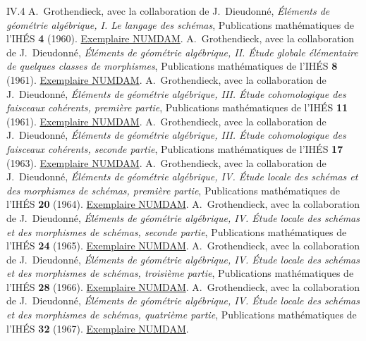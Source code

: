 \documentclass[11pt,a4paper]{article}
\begin{document}
\begin{thebibliography}{IV.4}
 A.~Grothendieck, avec la collaboration de J.~Dieudonné,
\emph{Éléments de géométrie algébrique, I. Le langage des schémas},
Publications mathématiques de l'IHÉS \textbf{4} (1960).
\href{https://numdam.org/item/PMIHES_1960__4__5_0/}{Exemplaire NUMDAM}.
 A.~Grothendieck, avec la collaboration de J.~Dieudonné,
\emph{Éléments de géométrie algébrique, II. Étude globale élémentaire
de quelques classes de morphismes}, Publications mathématiques de
l'IHÉS \textbf{8} (1961).
\href{https://www.numdam.org/item/PMIHES_1961__8__5_0.pdf}{Exemplaire NUMDAM}.
 A.~Grothendieck, avec la collaboration de J.~Dieudonné,
\emph{Éléments de géométrie algébrique, III. Étude cohomologique des
faisceaux cohérents, première partie}, Publications mathématiques de
l'IHÉS \textbf{11} (1961).
\href{https://www.numdam.org/articles/10.1007/BF02684273/}{Exemplaire NUMDAM}.
 A.~Grothendieck, avec la collaboration de J.~Dieudonné,
\emph{Éléments de géométrie algébrique, III. Étude cohomologique des
faisceaux cohérents, seconde partie}, Publications mathématiques de
l'IHÉS \textbf{17} (1963).
\href{https://numdam.org/articles/10.1007/BF02684890/}{Exemplaire NUMDAM}.
 A.~Grothendieck, avec la collaboration de J.~Dieudonné,
\emph{Éléments de géométrie algébrique, IV. Étude locale des schémas et
des morphismes de schémas, première partie}, Publications mathématiques
de l'IHÉS \textbf{20} (1964).
\href{https://numdam.org/articles/10.1007/BF02684747/}{Exemplaire NUMDAM}.
 A.~Grothendieck, avec la collaboration de J.~Dieudonné,
\emph{Éléments de géométrie algébrique, IV. Étude locale des schémas et
des morphismes de schémas, seconde partie}, Publications mathématiques
de l'IHÉS \textbf{24} (1965).
\href{https://numdam.org/articles/10.1007/BF02684322/}{Exemplaire NUMDAM}.
 A.~Grothendieck, avec la collaboration de J.~Dieudonné,
\emph{Éléments de géométrie algébrique, IV. Étude locale des schémas et
des morphismes de schémas, troisième partie}, Publications mathématiques
de l'IHÉS \textbf{28} (1966).
\href{https://numdam.org/articles/10.1007/BF02684343/}{Exemplaire NUMDAM}.
 A.~Grothendieck, avec la collaboration de J.~Dieudonné,
\emph{Éléments de géométrie algébrique, IV. Étude locale des schémas et
des morphismes de schémas, quatrième partie}, Publications mathématiques
de l'IHÉS \textbf{32} (1967).
\href{https://numdam.org/articles/10.1007/BF02732123/}{Exemplaire NUMDAM}.
\end{thebibliography}
\end{document}
